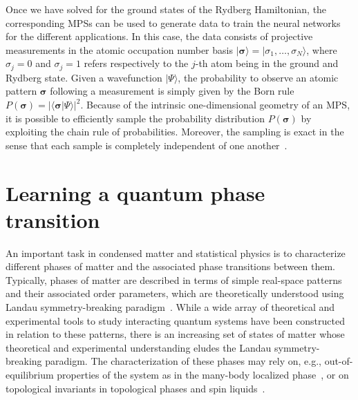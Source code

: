 \documentclass[twocolumn,english,reprint,superscriptaddress,longbibliography,pra]{revtex4-1}
\begin{document}
Once we have solved for the ground states of the Rydberg Hamiltonian, the corresponding MPSs can be used to generate data to train the neural networks for the different applications. In this case, the data consists of projective measurements in the atomic occupation number basis $|\bm{\sigma}\rangle=|\sigma_1,\dots,\sigma_N\rangle$, where $\sigma_j=0$ and $\sigma_j=1$ refers respectively to the $j$-th atom being in the ground and Rydberg state. Given a wavefunction $|\Psi\rangle$, the probability to observe an atomic pattern $\bm{\sigma}$ following a measurement is simply given by the Born rule $P(\bm{\sigma})=|\langle\bm{\sigma}|\Psi\rangle|^2$. Because of the intrinsic one-dimensional geometry of an MPS, it is possible to efficiently sample the probability distribution $P(\bm{\sigma})$ by exploiting the chain rule of probabilities. Moreover, the sampling is exact in the sense that each sample is completely independent of one another~\cite{PhysRevB.85.165146}. %





\section{Learning a quantum phase transition}
\label{supervised}

An important task in condensed matter and statistical physics is to characterize different phases of matter and the associated phase transitions between them.
Typically, phases of matter are described in terms of simple real-space patterns and their associated order parameters, which are theoretically understood using Landau symmetry-breaking paradigm~\cite{Xiao:803748}. While a wide array of theoretical and experimental tools to study interacting quantum systems have been constructed in relation to these patterns, there is an increasing set of states of matter whose theoretical and experimental understanding eludes the Landau symmetry-breaking paradigm. The characterization of these phases may rely on, e.g., out-of-equilibrium properties of the system as in the many-body localized phase~\cite{basko2006,RevModPhys.91.021001}, or on topological invariants in topological phases and spin liquids~\cite{Xiao:803748,savaryQuantumSpinLiquids2016, doi:10.1146/annurev-conmatphys-031218-013401}.    
\end{document}
